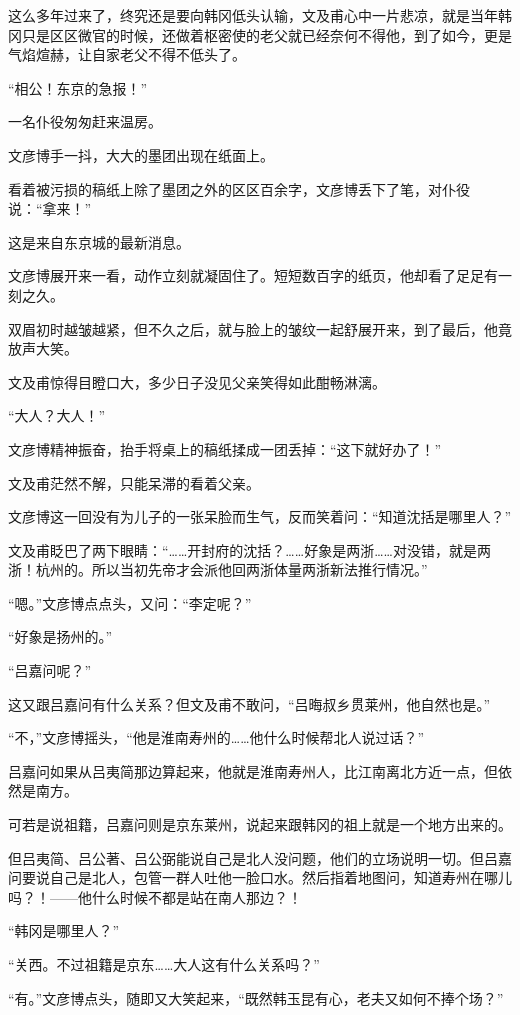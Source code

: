 这么多年过来了，终究还是要向韩冈低头认输，文及甫心中一片悲凉，就是当年韩冈只是区区微官的时候，还做着枢密使的老父就已经奈何不得他，到了如今，更是气焰煊赫，让自家老父不得不低头了。

“相公！东京的急报！”

一名仆役匆匆赶来温房。

文彦博手一抖，大大的墨团出现在纸面上。

看着被污损的稿纸上除了墨团之外的区区百余字，文彦博丢下了笔，对仆役说：“拿来！”

这是来自东京城的最新消息。

文彦博展开来一看，动作立刻就凝固住了。短短数百字的纸页，他却看了足足有一刻之久。

双眉初时越皱越紧，但不久之后，就与脸上的皱纹一起舒展开来，到了最后，他竟放声大笑。

文及甫惊得目瞪口大，多少日子没见父亲笑得如此酣畅淋漓。

“大人？大人！”

文彦博精神振奋，抬手将桌上的稿纸揉成一团丢掉：“这下就好办了！”

文及甫茫然不解，只能呆滞的看着父亲。

文彦博这一回没有为儿子的一张呆脸而生气，反而笑着问：“知道沈括是哪里人？”

文及甫眨巴了两下眼睛：“……开封府的沈括？……好象是两浙……对没错，就是两浙！杭州的。所以当初先帝才会派他回两浙体量两浙新法推行情况。”

“嗯。”文彦博点点头，又问：“李定呢？”

“好象是扬州的。”

“吕嘉问呢？”

这又跟吕嘉问有什么关系？但文及甫不敢问，“吕晦叔乡贯莱州，他自然也是。”

“不，”文彦博摇头，“他是淮南寿州的……他什么时候帮北人说过话？”

吕嘉问如果从吕夷简那边算起来，他就是淮南寿州人，比江南离北方近一点，但依然是南方。

可若是说祖籍，吕嘉问则是京东莱州，说起来跟韩冈的祖上就是一个地方出来的。

但吕夷简、吕公著、吕公弼能说自己是北人没问题，他们的立场说明一切。但吕嘉问要说自己是北人，包管一群人吐他一脸口水。然后指着地图问，知道寿州在哪儿吗？！——他什么时候不都是站在南人那边？！

“韩冈是哪里人？”

“关西。不过祖籍是京东……大人这有什么关系吗？”

“有。”文彦博点头，随即又大笑起来，“既然韩玉昆有心，老夫又如何不捧个场？”
